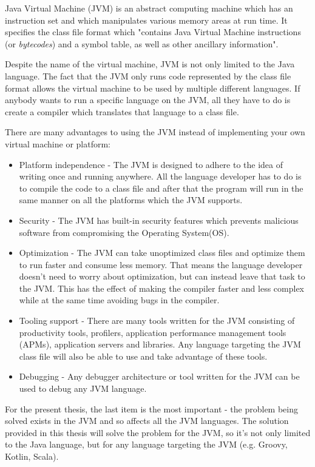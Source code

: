 \documentclass[..thesis.tex]{subfiles}
\begin{document}

Java Virtual Machine (JVM) is an abstract computing machine which has an instruction set and which manipulates various memory areas at run time.\cite{oracle_jvm_spec}
It specifies the class file format which "contains Java Virtual Machine instructions (or \textit{bytecodes}) and a symbol table, as well as other ancillary information"\cite{oracle_jvm_spec}.

Despite the name of the virtual machine, JVM is not only limited to the Java language. 
The fact that the JVM only runs code represented by the class file format allows the virtual machine to be used by multiple different languages.
If anybody wants to run a specific language on the JVM, all they have to do is create a compiler which translates that language to a class file.

There are many advantages to using the JVM instead of implementing your own virtual machine or platform:

\begin{itemize}
  \item Platform independence - 
    The JVM is designed to adhere to the idea of writing once and running anywhere. 
    All the language developer has to do is to compile the code to a class file and after that the program will run in the same manner on all the platforms which the JVM supports.
  \item Security - 
    The JVM has built-in security features which prevents malicious software from compromising the Operating System(OS). 
  \item Optimization - 
    The JVM can take unoptimized class files and optimize them to run faster and consume less memory. 
    That means the language developer doesn't need to worry about optimization, but can instead leave that task to the JVM.
    This has the effect of making the compiler faster and less complex while at the same time avoiding bugs in the compiler.
  \item Tooling support -
    There are many tools written for the JVM consisting of productivity tools, profilers, application performance management tools (APMs), application servers and libraries. 
    Any language targeting the JVM class file will also be able to use and take advantage of these tools.
  \item Debugging - 
    Any debugger architecture or tool written for the JVM can be used to debug any JVM language.
\end{itemize}

For the present thesis, the last item is the most important - the problem being solved exists in the JVM and so affects all the JVM languages. 
The solution provided in this thesis will solve the problem for the JVM, so it's not only limited to the Java language, but for any language targeting the JVM (e.g. Groovy, Kotlin, Scala).
 
\end{document}
